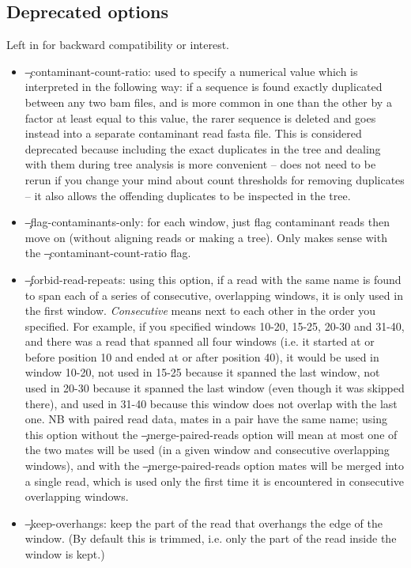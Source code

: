 \subsection{Deprecated options} \label{sec:DeprecatedArgs}
Left in \pmt for backward compatibility or interest.
\begin{itemize}
\item \c{--contaminant-count-ratio}: used to specify a numerical value which is interpreted in the following way: if a sequence is found exactly duplicated between any two bam files, and is more common in one than the other by a factor at least equal to this value, the rarer sequence is deleted and goes instead into a separate contaminant read fasta file.
This is considered deprecated because including the exact duplicates in the tree and dealing with them during tree analysis is more convenient -- \pmt does not need to be rerun if you change your mind about count thresholds for removing duplicates -- it also allows the offending duplicates to be inspected in the tree.
\item \c{--flag-contaminants-only}: for each window, just flag contaminant reads then move on (without aligning reads or making a tree).
Only makes sense with the \c{--contaminant-count-ratio} flag.
\item \c{--forbid-read-repeats}: using this option, if a read with the same name is found to span each of a series of consecutive, overlapping windows, it is only used in the first window.
{\it Consecutive} means next to each other in the order you specified.
For example, if you specified windows 10-20, 15-25, 20-30 and 31-40, and there was a read that spanned all four windows (i.e. it started at or before position 10 and ended at or after position 40), it would be used in window 10-20, not used in 15-25 because it spanned the last window, not used in 20-30 because it spanned the last window (even though it was skipped there), and used in 31-40 because this window does not overlap with the last one.
NB with paired read data, mates in a pair have the same name; using this option without the \c{--merge-paired-reads} option will mean at most one of the two mates will be used (in a given window and consecutive overlapping windows), and with the \c{--merge-paired-reads} option mates will be merged into a single read, which is used only the first time it is encountered in consecutive overlapping windows.
\item \c{--keep-overhangs}: keep the part of the read that overhangs the edge of the window.
(By default this is trimmed, i.e. only the part of the read inside the window is kept.)

\end{itemize}
